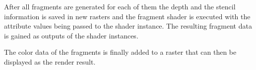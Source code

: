 After all fragments are generated for each of them the depth and the stencil information is saved in new rasters and the fragment shader is executed with the attribute values being passed to the shader instance. The resulting fragment data is gained as outputs of the shader instances.

The color data of the fragments is finally added to a raster that can then be displayed as the render result.




